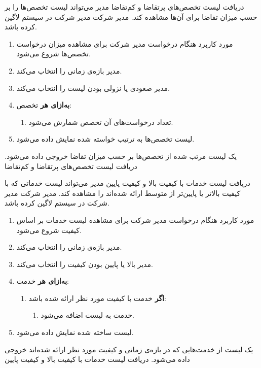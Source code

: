 {
\usecase
{دریافت لیست تخصص‌های پرتقاضا و کم‌تقاضا}
{}
{مدیر می‌تواند لیست تخصص‌ها را بر حسب میزان تقاضا برای آن‌ها مشاهده کند.}
{مدیر شرکت}
{}
{مدیر شرکت در سیستم لاگین کرده باشد.}
{
	\vspace*{-0.6cm}
	\begin{enumerate}
		\item 
		مورد کاربرد هنگام درخواست مدیر شرکت برای مشاهده میزان درخواست تخصص‌ها شروع می‌شود.
		\item
		مدیر بازه‌ی زمانی را انتخاب می‌کند.
		\item
		مدیر صعودی یا نزولی بودن لیست را انتخاب می‌کند.
		\item
		\textbf{به‌ازای هر} تخصص:
		\begin{enumerate}[label=\theenumi.\arabic*.]
			\item تعداد درخواست‌های آن تخصص شمارش می‌شود.
		\end{enumerate}
		\item
		لیست تخصص‌ها به ترتیب خواسته شده نمایش داده می‌شود.
	\end{enumerate}
}
{یک لیست مرتب شده از تخصص‌ها بر حسب میزان تقاضا خروجی داده می‌شود.}
{
}
{
	دریافت لیست تخصص‌های پرتقاضا و کم‌تقاضا
}
}

{
\usecase
{دریافت لیست خدمات با کیفیت بالا و کیفیت پایین}
{}
{مدیر می‌تواند لیست خدماتی که با کیفیت بالاتر یا پایین‌تر از متوسط ارائه شده‌اند را مشاهده کند.}
{مدیر شرکت}
{}
{مدیر شرکت در سیستم لاگین کرده باشد.}
{
	\vspace*{-0.6cm}
	\begin{enumerate}
		\item 
		مورد کاربرد هنگام درخواست مدیر شرکت برای مشاهده لیست خدمات بر اساس کیفیت شروع می‌شود.
		\item
		مدیر بازه‌ی زمانی را انتخاب می‌کند.
		\item
		مدیر بالا یا پایین بودن کیفیت را انتخاب می‌کند.
		\item
		\textbf{به‌ازای هر} خدمت:
		\begin{enumerate}[label=\theenumi.\arabic*.]
			\item 
			\textbf{اگر} خدمت با کیفیت مورد نظر ارائه شده باشد:
			\begin{enumerate}
				\item 
				خدمت به لیست اضافه می‌شود.
			\end{enumerate}
		\end{enumerate}
		\item
		لیست ساخته شده نمایش داده می‌شود.
	\end{enumerate}
}
{یک لیست از خدمت‌هایی که در بازه‌ی زمانی و کیفیت مورد نظر ارائه شده‌اند خروجی داده می‌شود.}
{
}
{
	دریافت لیست خدمات با کیفیت بالا و کیفیت پایین
}
}

